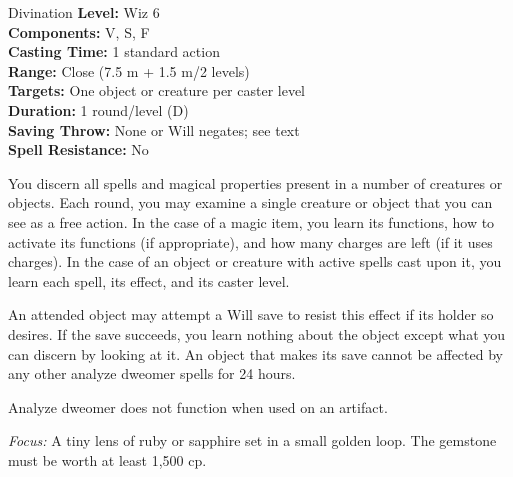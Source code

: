 {Divination}
{
	\textbf{Level:}
	Wiz 6\\
	\textbf{Components:}
	V, S, F\\
	\textbf{Casting Time:}
	1 standard action\\
	\textbf{Range:}
	Close (7.5 m + 1.5 m/2 levels)\\
	\textbf{Targets:}
	One object or creature per caster level\\
	\textbf{Duration:}
	1 round/level (D)\\
	\textbf{Saving Throw:}
	None or Will negates; see text\\
	\textbf{Spell Resistance:}
	No\\
}
{
	You discern all spells and magical properties present in a number of creatures or objects. Each round, you may examine a single creature or object that you can see as a free action. In the case of a magic item, you learn its functions, how to activate its functions (if appropriate), and how many charges are left (if it uses charges). In the case of an object or creature with active spells cast upon it, you learn each spell, its effect, and its caster level.

	An attended object may attempt a Will save to resist this effect if its holder so desires. If the save succeeds, you learn nothing about the object except what you can discern by looking at it. An object that makes its save cannot be affected by any other analyze dweomer spells for 24 hours.

	Analyze dweomer does not function when used on an artifact.

	\textit{Focus:}
	A tiny lens of ruby or sapphire set in a small golden loop. The gemstone must be worth at least 1,500 cp.

}
